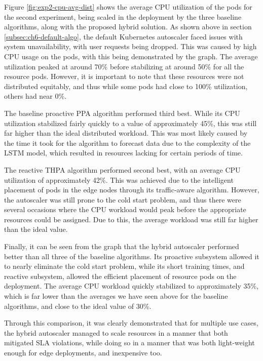 Figure \ref{fig:exp2-cpu-avg-dist} shows the average CPU utilization of the pods for the second experiment, being scaled in the deployment by the three baseline algorithms, along with the proposed hybrid solution. As shown above in section \ref{subsec:ch6-default-algo}, the default Kubernetes autoscaler faced issues with system unavailability, with user requests being dropped. This was caused by high CPU usage on the pods, with this being demonstrated by the graph. The average utilization peaked at around 70\% before stabilizing at around 50\% for all the resource pods. However, it is important to note that these resources were not distributed equitably, and thus while some pods had close to 100\% utilization, others had near 0\%.\par

The baseline proactive PPA algorithm performed third best. While its CPU utilization stabilized fairly quickly to a value of approximately 45\%, this was still far higher than the ideal distributed workload. This was most likely caused by the time it took for the algorithm to forecast data due to the complexity of the LSTM model, which resulted in resources lacking for certain periods of time.\par

The reactive THPA algorithm performed second best, with an average CPU utilization of approximately 42\%. This was achieved due to the intelligent placement of pods in the edge nodes through its traffic-aware algorithm. However, the autoscaler was still prone to the cold start problem, and thus there were several occasions where the CPU workload would peak before the appropriate resources could be assigned. Due to this, the average workload was still far higher than the ideal value.\par

Finally, it can be seen from the graph that the hybrid autoscaler performed better than all three of the baseline algorithms. Its proactive subsystem allowed it to nearly eliminate the cold start problem, while its short training times, and reactive subsystem, allowed the efficient placement of resource pods on the deployment. The average CPU workload quickly stabilized to approximately 35\%, which is far lower than the averages we have seen above for the baseline algorithms, and close to the ideal value of 30\%.\par

Through this comparison, it was clearly demonstrated that for multiple use cases, the hybrid autoscaler managed to scale resources in a manner that both mitigated SLA violations, while doing so in a manner that was both light-weight enough for edge deployments, and inexpensive too.\par

